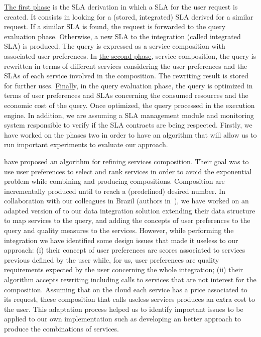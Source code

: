 \underline{The first phase} is the SLA derivation in which a SLA for the user request is created. It consists in looking for a (stored, integrated) SLA derived for a similar request. If a similar SLA is found, the request is forwarded to the query evaluation phase. Otherwise, a new SLA to the integration (called integrated SLA) is produced. The query is expressed as a service composition with associated user preferences. In \underline{the second phase}, service composition, the query is rewritten in terms of different services considering the user preferences and the SLAs of each service involved in the composition. The rewriting result is stored for further uses. \underline{Finally}, in the query evaluation phase, the query is optimized in terms of user preferences and SLAs concerning the consumed resources and the economic cost of the query. Once optimized, the query processed in the execution engine. In addition, we are assuming a SLA management module and monitoring system responsible to verify if the SLA contracts are being respected. Firstly, we have worked on the phases two in order to have an algorithm that will allow us to run important experiments to evaluate our approach. 
	
\cite{ba2014} have proposed an algorithm for refining services composition. Their goal was to use user preferences to select and rank services in order to avoid the exponential problem while combining and producing compositions. Composition are incrementally produced until to reach a (predefined) desired number. In collaboration with our colleagues in Brazil (authors in~\cite{ba2014}), we have worked on an adapted version of \cite{ba2014} to our data integration solution extending their data structure to map services to the query, and adding the concepts of user preferences to the query and quality measures to the services. However, while performing the integration we have identified some design issues that made it useless to our approach: (i) their concept of user preferences are scores associated to services previous defined by the user while, for us, user preferences are quality requirements expected by the user concerning the whole integration; (ii) their algorithm accepts rewriting including calls to services that are not interest for the composition. Assuming that on the cloud each service has a price associated to its request, these composition that calls useless services produces an extra cost to the user. This adaptation process helped us to identify important issues to be applied to our own implementation such as developing an better approach to produce the combinations of services.

